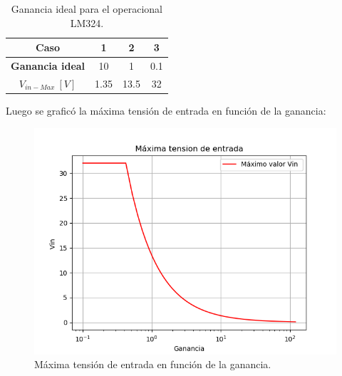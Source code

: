 \begin{table}[H]
\begin{center}
\label{tab:maxin}
\begin{tabular}{|c|c|c|c|}
\hline
\textbf{Caso}        & \textbf{1} & \textbf{2} & \textbf{3} \\ \hline
\textbf{Ganancia ideal}     & 10         & 1          & 0.1        \\ \hline
\textbf{$V_{in-Max} \ \left[ V \right]$} & 1.35       & 13.5       & 32         \\ \hline
\end{tabular}
\end{center}
\caption{Ganancia ideal para el operacional LM324.}
\label{tab:gananciaideal}
\end{table}

Luego se graficó la máxima tensión de entrada en función de la ganancia:
\begin{figure}[H]	
	\centering
	\includegraphics[width=\textwidth]{Ejercicio1/Imagenes/maxvin.png}
	\caption{Máxima tensión de entrada en función de la ganancia.}
	\label{fig:MaxVin}
\end{figure} 

